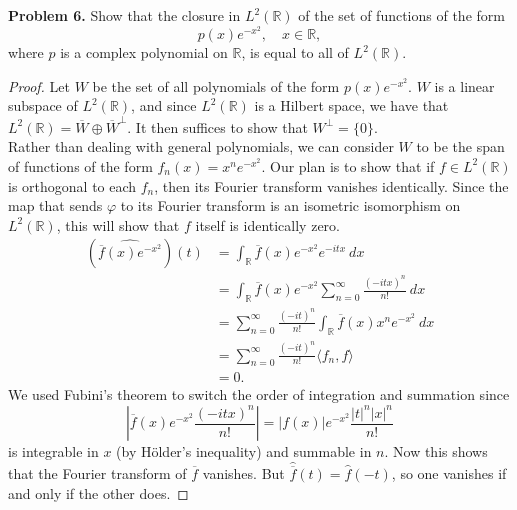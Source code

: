 \documentclass[11pt,letterpaper]{report}
\newcommand{\reals}{\mathbb{R}}
\begin{document}
\noindent\textbf{Problem 6. }
Show that the closure in $L^2(\reals)$ of the set of functions of the form
\[
p(x)e^{-x^2},\quad x\in \reals,
\]
where $p$ is a complex polynomial on $\reals$, is equal to all of $L^2(\reals)$.
\begin{proof}
	Let $W$ be the set of all polynomials of the form $p(x)e^{-x^2}$. $W$ is a linear subspace of $L^2(\reals)$, and since $L^2(\reals)$ is a Hilbert space, we have that $L^2(\reals) = \overline{W}\oplus \overline{W}^\perp$. It then suffices to show that $W^\perp= \{0\}$.\\

	\noindent Rather than dealing with general polynomials, we can consider $W$ to be the span of functions of the form $f_n(x) = x^ne^{-x^2}$. Our plan is to show that if $f\in L^2(\reals)$ is orthogonal to each $f_n$, then its Fourier transform vanishes identically. Since the map that sends $\varphi$ to its Fourier transform is an isometric isomorphism on $L^2(\reals)$, this will show that $f$ itself is identically zero.
	\begin{align*}
		(\widehat{\overline{f}(x)e^{-x^2}})(t)&= \int_\reals \overline{f}(x)e^{-x^2}e^{-itx}\ dx\\
		&= \int_\reals \overline{f}(x)e^{-x^2}\sum_{n=0}^\infty \frac{(-itx)^n}{n!}\ dx\\
		&= \sum_{n=0}^\infty \frac{(-it)^n}{n!}\int_\reals\overline{f}(x)x^ne^{-x^2}\ dx\\
		&= \sum_{n=0}^\infty \frac{(-it)^n}{n!}\langle f_n, f\rangle\\
		&= 0.
	\end{align*}
	We used Fubini's theorem to switch the order of integration and summation since
	\[
	\left|\overline{f}(x)e^{-x^2}\frac{(-itx)^n}{n!}\right| = |f(x)|e^{-x^2}\frac{|t|^n|x|^n}{n!}
	\]
	is integrable in $x$ (by H\"older's inequality) and summable in $n$. Now this shows that the Fourier transform of $\overline{f}$ vanishes. But $\widehat{\overline{f}}(t) = \widehat{f}(-t)$, so one vanishes if and only if the other does. 
\end{proof}
\end{document}
